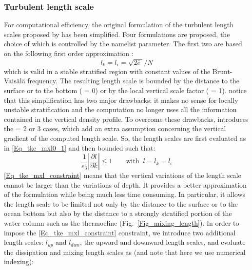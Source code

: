\subsubsection{Turbulent length scale}
For computational efficiency, the original formulation of the turbulent length 
scales proposed by \citet{Gaspar1990} has been simplified. Four formulations 
are proposed, the choice of which is controlled by the  namelist 
parameter. The first two are based on the following first order approximation 
\citep{Blanke1993}:
\begin{equation} \label{Eq_tke_mxl0_1}
l_k = l_\epsilon = \sqrt {2 \bar{e}\; } / N
\end{equation}
which is valid in a stable stratified region with constant values of the Brunt-
Vais\"{a}l\"{a} frequency. The resulting length scale is bounded by the distance 
to the surface or to the bottom ( = 0) or by the local vertical scale factor 
( = 1). \citet{Blanke1993} notice that this simplification has two major 
drawbacks: it makes no sense for locally unstable stratification and the 
computation no longer uses all the information contained in the vertical density 
profile. To overcome these drawbacks, \citet{Madec1998} introduces the 
 = 2 or 3 cases, which add an extra assumption concerning the vertical 
gradient of the computed length scale. So, the length scales are first evaluated 
as in \eqref{Eq_tke_mxl0_1} and then bounded such that:
\begin{equation} \label{Eq_tke_mxl_constraint}
\frac{1}{e_3 }\left| {\frac{\partial l}{\partial k}} \right| \leq 1
\qquad \text{with }\  l =  l_k = l_\epsilon
\end{equation}
\eqref{Eq_tke_mxl_constraint} means that the vertical variations of the length 
scale cannot be larger than the variations of depth. It provides a better 
approximation of the \citet{Gaspar1990} formulation while being much less 
time consuming. In particular, it allows the length scale to be limited not only 
by the distance to the surface or to the ocean bottom but also by the distance 
to a strongly stratified portion of the water column such as the thermocline 
(Fig.~\ref{Fig_mixing_length}). In order to impose the \eqref{Eq_tke_mxl_constraint} 
constraint, we introduce two additional length scales: $l_{up}$ and $l_{dwn}$, 
the upward and downward length scales, and evaluate the dissipation and 
mixing length scales as (and note that here we use numerical indexing):
